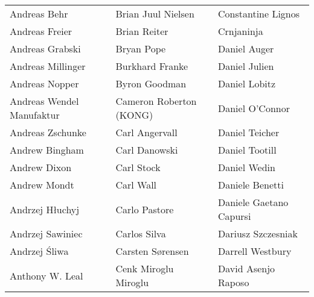 \begin{tabular}{p{4.5cm}p{4.5cm}p{4.5cm}}
Andreas Behr & Brian Juul Nielsen & Constantine Lignos \\
Andreas Freier & Brian Reiter & Crnjaninja \\
Andreas Grabski & Bryan Pope & Daniel Auger \\
Andreas Millinger & Burkhard Franke & Daniel Julien \\
Andreas Nopper & Byron Goodman & Daniel Lobitz \\
Andreas Wendel Manufaktur & Cameron Roberton (KONG) & Daniel O'Connor \\
Andreas Zschunke & Carl Angervall & Daniel Teicher \\
Andrew Bingham & Carl Danowski & Daniel Tootill \\
Andrew Dixon & Carl Stock & Daniel Wedin \\
Andrew Mondt & Carl Wall & Daniele Benetti \\
Andrzej Hłuchyj & Carlo Pastore & Daniele Gaetano Capursi \\
Andrzej Sawiniec & Carlos Silva & Dariusz Szczesniak \\
Andrzej Śliwa & Carsten Sørensen & Darrell Westbury \\
Anthony W. Leal & Cenk Miroglu Miroglu & David Asenjo Raposo \\
\end{tabular}
\newpage
\setlength{\tabcolsep}{1mm}
